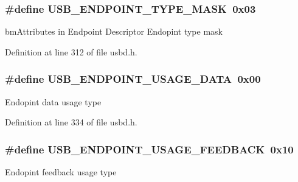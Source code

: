 \subsubsection[{\texorpdfstring{U\+S\+B\+\_\+\+E\+N\+D\+P\+O\+I\+N\+T\+\_\+\+T\+Y\+P\+E\+\_\+\+M\+A\+SK}{USB_ENDPOINT_TYPE_MASK}}]{\setlength{\rightskip}{0pt plus 5cm}\#define U\+S\+B\+\_\+\+E\+N\+D\+P\+O\+I\+N\+T\+\_\+\+T\+Y\+P\+E\+\_\+\+M\+A\+SK~0x03}\hypertarget{group__USBD__Core_gacd114fdf068aaa69407358ee5ccfd170}{}\label{group__USBD__Core_gacd114fdf068aaa69407358ee5ccfd170}
bm\+Attributes in Endpoint Descriptor Endopint type mask 

Definition at line 312 of file usbd.\+h.

\subsubsection[{\texorpdfstring{U\+S\+B\+\_\+\+E\+N\+D\+P\+O\+I\+N\+T\+\_\+\+U\+S\+A\+G\+E\+\_\+\+D\+A\+TA}{USB_ENDPOINT_USAGE_DATA}}]{\setlength{\rightskip}{0pt plus 5cm}\#define U\+S\+B\+\_\+\+E\+N\+D\+P\+O\+I\+N\+T\+\_\+\+U\+S\+A\+G\+E\+\_\+\+D\+A\+TA~0x00}\hypertarget{group__USBD__Core_gac852b5e62e4e577b1b43239ae190908a}{}\label{group__USBD__Core_gac852b5e62e4e577b1b43239ae190908a}
Endopint data usage type 

Definition at line 334 of file usbd.\+h.

\subsubsection[{\texorpdfstring{U\+S\+B\+\_\+\+E\+N\+D\+P\+O\+I\+N\+T\+\_\+\+U\+S\+A\+G\+E\+\_\+\+F\+E\+E\+D\+B\+A\+CK}{USB_ENDPOINT_USAGE_FEEDBACK}}]{\setlength{\rightskip}{0pt plus 5cm}\#define U\+S\+B\+\_\+\+E\+N\+D\+P\+O\+I\+N\+T\+\_\+\+U\+S\+A\+G\+E\+\_\+\+F\+E\+E\+D\+B\+A\+CK~0x10}\hypertarget{group__USBD__Core_gabe8c89e5b624ac6bb5b9cd2919fc06be}{}\label{group__USBD__Core_gabe8c89e5b624ac6bb5b9cd2919fc06be}
Endopint feedback usage type 

